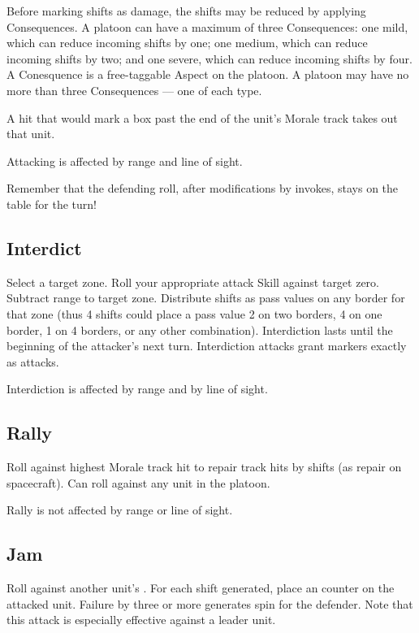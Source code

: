 Before marking shifts as damage, the shifts may be reduced by applying Consequences. A platoon can have a maximum of three Consequences: one mild, which can reduce incoming shifts by one; one medium, which can reduce incoming shifts by two; and one severe, which can reduce incoming shifts by four. A Conesquence is a free-taggable Aspect on the platoon. A platoon may have no more than three Consequences --- one of each type.

A hit that would mark a box past the end of the unit's Morale track takes out that unit.

Attacking is affected by range and line of sight.

Remember that the defending roll, after modifications by invokes, stays on the table for the turn!

\subsection{Interdict}\label{sec:platoon-combat-interdict}

Select a target zone. Roll your appropriate attack Skill against target zero. Subtract range to target zone. Distribute shifts as pass values on any border for that zone (thus 4 shifts could place a pass value 2 on two borders, 4 on one border, 1 on 4 borders, or any other combination). Interdiction lasts until the beginning of the attacker's next turn. Interdiction attacks grant \SPOTTED{} markers exactly as attacks.

Interdiction is affected by range and by line of sight.

\subsection{Rally}\label{sec:platoon-combat-rally}

Roll  against highest Morale track hit to repair track hits by shifts (as repair on spacecraft). Can roll against any unit in the platoon.

Rally is not affected by range or line of sight.

\subsection{Jam}\label{sec:platoon-combat-jam}

Roll  against another unit's . For each shift generated, place an \OOC{} counter on the attacked unit. Failure by three or more generates spin for the defender. Note that this attack is especially effective against a leader unit.


